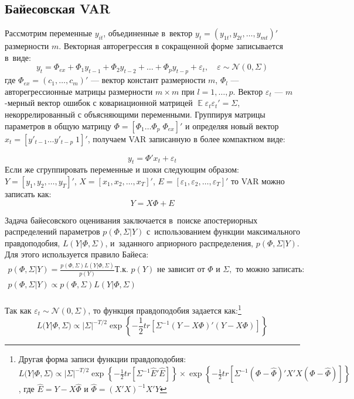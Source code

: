 \documentclass[11pt]{article} %
\DeclareMathOperator{\E}{\mathbb{E}}
\newcommand{\cN}{\mathcal{N}}
\begin{document}
\subsection{Байесовская VAR}
Рассмотрим переменные $y_{it}$, объединенные в~вектор  $y_{t}=(y_{1t},y_{2t},\ldots, y_{mt})'$ размерности $m$. Векторная авторегрессия в сокращенной форме записывается в~виде:
\begin{equation}
y_t =\Phi_{ex}+ \Phi_1 y_{t-1} + \Phi_2 y_{t-2} +\ldots + \Phi_p y_{t-p} + \varepsilon_t,\quad \varepsilon\sim \cN(0,\Sigma)
\end{equation}
где $\Phi_{ex}=(c_1,\ldots ,c_m)'$ --- вектор констант размерности $m$, $\Phi_l$ --– авторегрессионные матрицы размерности $m\times m$ при $l=1, \ldots, p$. Вектор $\varepsilon_t$ --- $m$-мерный вектор ошибок с ковариационной матрицей $\E\varepsilon_t \varepsilon _t'=\Sigma$, некоррелированный с объясняющими переменными.
Группируя матрицы параметров в общую матрицу $\Phi=[\Phi_1 \ldots \Phi_p \; \Phi_{ex}]'$ %
и определяя новый вектор $x_t=[ y'_{t-1} \ldots  y'_{t-p} \; 1]'$, получаем VAR записанную в более компактном виде:

\begin{equation}
y_t=\Phi' x_t+\varepsilon_t
\end{equation}
Если же сгруппировать переменные  и шоки следующим образом: $Y=[y_1, y_2,\ldots, y_T]'$, $X=[x_1, x_2,\ldots, x_T]'$, $E=[\varepsilon_1, \varepsilon_2,\ldots, \varepsilon_T]'$ то VAR можно записать как:
\begin{equation}
Y=X\Phi+E\label{var}
\end{equation}

Задача байесовского оценивания заключается в~поиске апостериорных распределений параметров $p(\Phi, \Sigma|Y)$ с~использованием функции максимального правдоподобия, $L(Y|\Phi, \Sigma)$, и~заданного априорного распределения, $p(\Phi, \Sigma|Y)$. Для этого используется правило Байеса:
\begin{gather}
p(\Phi, \Sigma|Y)=\frac{p(\Phi,\Sigma) L(Y|\Phi,\Sigma)}{p(Y)}
\text{Т.к. }p(Y) \text{ не зависит от } \Phi \text{ и }\Sigma, \text{ то можно записать: }\\
p(\Phi, \Sigma|Y)\propto p(\Phi,\Sigma) L(Y|\Phi,\Sigma)
\end{gather}\\
Так как $\varepsilon_t\sim \cN(0,\Sigma)$, то функция правдоподобия задается как:\footnote{ Другая форма записи функции правдоподобия: $L(Y|\Phi, \Sigma) \propto |\Sigma|^{-T/2}\exp\left\lbrace -\frac{1}{2} tr \left[\Sigma^{-1} \hat E' \hat E\right]\right\rbrace \times \exp\left\lbrace -\frac{1}{2} tr \left[\Sigma^{-1}(\Phi-\hat\Phi)'X'X(\Phi-\hat\Phi)\right]\right\rbrace$, где $\hat E=Y-X\hat\Phi$ и $\hat \Phi=(X'X)^{-1}X'Y$}
\begin{equation}
L(Y|\Phi, \Sigma) \propto |\Sigma|^{-T/2}\exp\left\lbrace -\frac{1}{2} tr \left[\Sigma^{-1}(Y-X\Phi)'(Y-X\Phi)\right]\right\rbrace\label{likelihood}
\end{equation}
\end{document}
